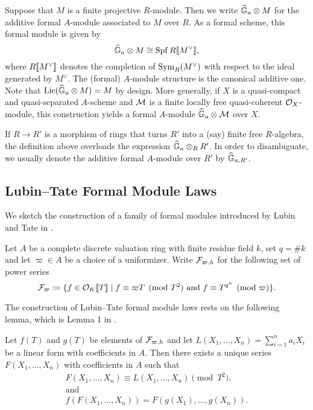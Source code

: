 \documentclass[../main.tex]{subfiles}
\begin{document}
\begin{defi}
  \label{def:additiveformalmoduleassociatedtomodule}
  Suppose that $M$ is a finite projective $R$-module. Then we write
  $\widehat{\mathbb{G}}_a \otimes M$ for the additive formal $A$-module associated to $M$ over $R$.
  As a formal scheme, this formal module is given by
  \begin{equation*}
    \widehat{\mathbb{G}}_a \otimes M \cong \operatorname{Spf} R \llbracket M^\vee \rrbracket,
  \end{equation*}
  where $R \llbracket M^\vee \rrbracket$ denotes the completion of $\operatorname{Sym}_R(M^\vee)$ with respect
  to the ideal generated by $M^\vee$. The (formal) $A$-module structure is the
  canonical additive one. 
  Note that $\operatorname{Lie}(\widehat{\mathbb{G}}_a \otimes M) = M$ by design. 
  More generally, if $X$ is a quasi-compact and quasi-separated $A$-scheme
  and $\mathcal{M}$ is a finite locally free quasi-coherent 
  $\mathcal{O}_X$-module, this construction yields a formal $A$-module
  $\widehat{\mathbb{G}}_a \otimes \mathcal{M}$ over $X$.
\end{defi}
\begin{rmk} 
  If $R\to R'$ is a morphism of rings that turns $R'$ into a (say) finite free
  $R$-algebra, the definition above overloads the expression $\widehat{\mathbb{G}}_a \otimes_R R'$.
  In order to disambiguate, we usually denote the additive formal $A$-module
  over $R'$ by $\widehat{\mathbb{G}}_{a, R'}$. 
\end{rmk}


\subsection{Lubin--Tate Formal Module Laws} %
\label{sub:Lubin--Tate Formal Module Laws}
We sketch the construction of a family of formal modules introduced by 
Lubin and Tate in \cite{LubinTateFormalMult}.

Let $A$ be a complete discrete valuation ring with 
finite residue field $k$, set $q = \# k$ and let $\varpi \in A$ be a choice of a
uniformizer.
Write $\mathcal{F}_{\varpi, h}$ for the following set of power series
\begin{equation*}
  \mathcal{F}_\varpi \coloneqq \{f \in \mathcal{O}_K \llbracket T \rrbracket \mid f \equiv \varpi T \pmod {T^2}
  \text{ and } f \equiv T^{q^n} \pmod \varpi\}. 
\end{equation*}

The construction of Lubin--Tate formal module laws rests on the following 
lemma, which is Lemma 1 in \cite{LubinTateFormalMult}.
\begin{lem}\label{lem:LTLemma1}
  Let $f(T)$ and $g(T)$ be elements of $\mathcal{F}_{\varpi,h}$ and let 
  $L(X_1, \dots, X_n) = \sum_{i=1}^n a_i X_i$ be a linear form with coefficients in 
  $A$. Then there exists a unique series $F(X_1, \dots, X_n)$ with coefficients 
  in $A$ such that 
  \begin{gather*}
    F(X_1, \dots, X_n) \equiv L(X_1, \dots, X_n) \pmod {T^2}, \\ \text{and} \\
    f(F(X_1, \dots, X_n)) = F(g(X_1), \dots, g(X_n)).
  \end{gather*}
\end{lem}
\end{document}
